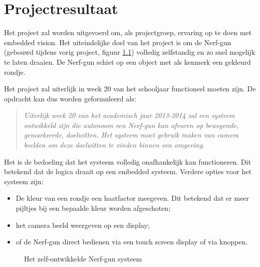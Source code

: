\chapter{Projectresultaat}

Het project zal worden uitgevoerd om, als projectgroep, ervaring op te doen met
embedded vision. Het uiteindelijke doel van het project is om de Nerf-gun
(gebouwd tijdens vorig project, figuur \ref{fig:nerf}) volledig zelfstandig en
zo snel mogelijk te laten draaien. De Nerf-gun schiet op een object met als
kenmerk een gekleurd rondje.

Het project zal uiterlijk in week 20 van het schooljaar functioneel moeten
zijn. De opdracht kan dus worden geformuleerd als:

\begin{quotation}
\emph{Uiterlijk week 20 van het academisch jaar 2013-2014 zal een systeem
ontwikkeld zijn die autonoom een Nerf-gun kan afvuren op bewegende, gemarkeerde,
doelwitten. Het systeem moet gebruik maken van camera beelden om deze doelwitten
te vinden binnen een omgeving.}
\end{quotation}

Het is de bedoeling dat het systeem volledig onafhankelijk kan functioneren.
Dit betekend dat de logica draait op een embedded systeem. Verdere opties voor
het systeem zijn:

\begin{itemize}
    \item De kleur van een rondje een haatfactor meegeven. Dit betekend dat er
        meer pijltjes bij een bepaalde kleur worden afgeschoten;
    \item het camera beeld weergeven op een display;
    \item of de Nerf-gun direct bedienen via een touch screen display of via
        knoppen.
\end{itemize}

\begin{figure}
    \caption{Het zelf-ontwikkelde Nerf-gun systeem}
    \label{fig:nerf}
\end{figure}
